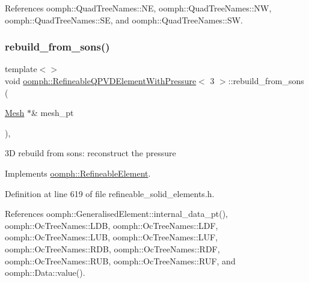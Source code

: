 References oomph\+::\+Quad\+Tree\+Names\+::\+NE, oomph\+::\+Quad\+Tree\+Names\+::\+NW, oomph\+::\+Quad\+Tree\+Names\+::\+SE, and oomph\+::\+Quad\+Tree\+Names\+::\+SW.

\mbox{\label{classoomph_1_1RefineableQPVDElementWithPressure_a11e3bc01af8930b5669bbaf27ab16a5c}} 
\subsubsection{\texorpdfstring{rebuild\+\_\+from\+\_\+sons()}{rebuild\_from\_sons()}\hspace{0.1cm}{\footnotesize\ttfamily [3/3]}}
{\footnotesize\ttfamily template$<$$>$ \\
void \hyperlink{classoomph_1_1RefineableQPVDElementWithPressure}{oomph\+::\+Refineable\+Q\+P\+V\+D\+Element\+With\+Pressure}$<$ 3 $>$\+::rebuild\+\_\+from\+\_\+sons (\begin{DoxyParamCaption}\item[{\hyperlink{classoomph_1_1Mesh}{Mesh} $\ast$\&}]{mesh\+\_\+pt }\end{DoxyParamCaption})\hspace{0.3cm}{\ttfamily [inline]}, {\ttfamily [virtual]}}



3D rebuild from sons\+: reconstruct the pressure 



Implements \hyperlink{classoomph_1_1RefineableElement_a33324be27833fa4b78279d17158215fa}{oomph\+::\+Refineable\+Element}.



Definition at line 619 of file refineable\+\_\+solid\+\_\+elements.\+h.



References oomph\+::\+Generalised\+Element\+::internal\+\_\+data\+\_\+pt(), oomph\+::\+Oc\+Tree\+Names\+::\+L\+DB, oomph\+::\+Oc\+Tree\+Names\+::\+L\+DF, oomph\+::\+Oc\+Tree\+Names\+::\+L\+UB, oomph\+::\+Oc\+Tree\+Names\+::\+L\+UF, oomph\+::\+Oc\+Tree\+Names\+::\+R\+DB, oomph\+::\+Oc\+Tree\+Names\+::\+R\+DF, oomph\+::\+Oc\+Tree\+Names\+::\+R\+UB, oomph\+::\+Oc\+Tree\+Names\+::\+R\+UF, and oomph\+::\+Data\+::value().

